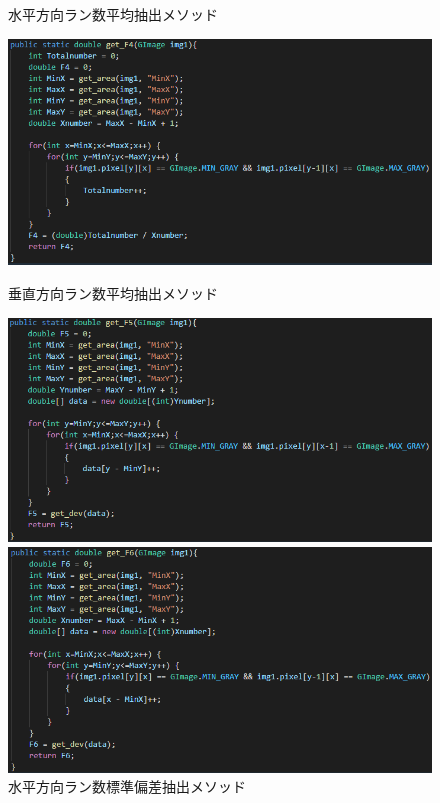 \begin{enumerate}
\begin{itemize}
\begin{itemize}
\begin{figure}[htbp]
\begin{minipage}[t]{0.45\hsize}
          \centering
          \caption{水平方向ラン数平均抽出メソッド}
          \label{graph:7}
        \end{minipage}
        \begin{minipage}[t]{0.45\hsize}
          \includegraphics[scale=0.3]{垂直方向ラン数平均抽出1.PNG}
          \centering
          \caption{垂直方向ラン数平均抽出メソッド}
          \label{graph:8}
        \end{minipage}
        \begin{minipage}[t]{0.45\hsize}
          \includegraphics[scale=0.3]{水平方向ラン数標準偏差抽出1.PNG}
          \centering
          \caption{水平方向ラン数標準偏差抽出メソッド}
          \label{graph:9}
        \end{minipage}
        \begin{minipage}[t]{0.45\hsize}
          \includegraphics[scale=0.3]{垂直方向ラン数標準偏差抽出1.PNG}

\end{minipage}
\end{figure}
\end{itemize}
\end{itemize}
\end{enumerate}
